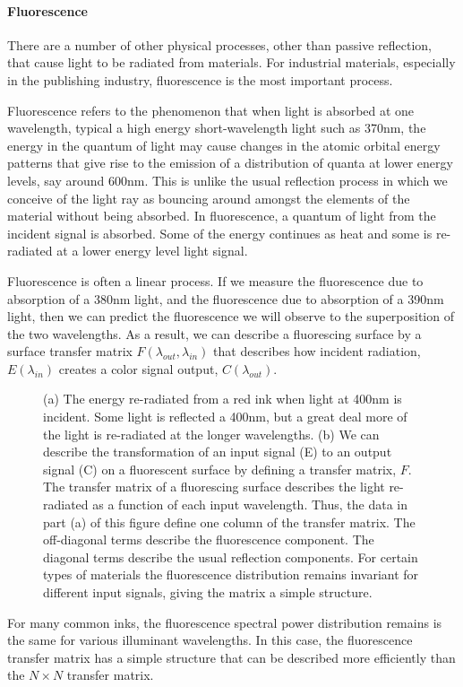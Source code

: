 \paragraph{Fluorescence}
There are a number of other physical processes,
other than passive reflection,
that cause light to be radiated from materials.
For industrial materials, especially in the publishing industry,
fluorescence is the most important process.

Fluorescence refers to the phenomenon that when light
is absorbed at one wavelength, typical a high energy
short-wavelength light such as 370nm, the energy
in the quantum of light may cause changes in the
atomic orbital energy patterns that give rise to
the emission of a distribution of quanta at lower
energy levels, say around 600nm.
This is unlike the usual reflection process in which
we conceive of the light ray as bouncing around amongst
the elements of the material without being absorbed.
In fluorescence, a quantum of light from the
incident signal is absorbed.
Some of the energy continues as heat and some is
re-radiated at a lower energy level light signal.

Fluorescence is often a linear process.
If we measure the fluorescence due to absorption of
a 380nm light, and the fluorescence due to absorption
of a 390nm light, then we can predict the fluorescence
we will observe to the superposition of the two wavelengths.
As a result, we can describe a fluorescing surface by
a surface transfer matrix $F( \lambda_{out}, \lambda_{in})$
that describes how incident
radiation, $E( \lambda_{in} )$ creates a color signal
output, $C( \lambda_{out})$.

\begin{figure}
\centerline{
}
\caption[Fluorescence Matrix Tableau]{
(a)  The energy re-radiated from a red ink when
light at 400nm is incident.
Some light is reflected a 400nm, but a great deal
more of the light is re-radiated at the longer wavelengths.
(b) We can describe the transformation of an input
signal (E) to an output signal (C)
on a fluorescent surface by defining a transfer matrix, $F$.
The transfer matrix of a fluorescing surface describes
the light re-radiated as a function of each input wavelength.
Thus, the data in part (a) of this figure define one
column of the transfer matrix.
The off-diagonal terms describe the fluorescence component.
The diagonal terms describe the usual reflection components.
For certain types of materials the fluorescence distribution
remains invariant for different input signals, giving
the matrix a simple structure.
}
\label{f8:fluorescence}
\end{figure}

For many common inks, the fluorescence spectral power
distribution remains is the same
for various illuminant wavelengths.
In this case,
the fluorescence transfer matrix has a simple
structure that can be described more efficiently
than the $N \times N$ transfer matrix.


